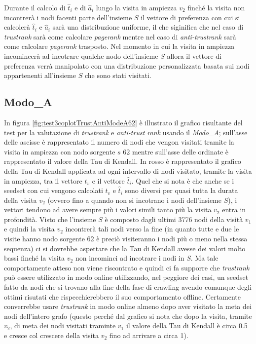 Durante il calcolo di \(\hat{t}_i\) e di \(\hat{a}_i\) lungo la visita in ampiezza \(v_2\) finché la visita non incontrerà i nodi facenti parte dell'insieme \(S\) il vettore di preferenza con cui si calcolerà \(\hat{t}_i\) e \(\hat{a}_i\) sarà una distribuzione uniforme, il che siginifica che nel caso di \textit{trustrank} sarà come calcolare \textit{pagerank} mentre nel caso di \textit{anti-trustrank} sarà come calcolare \textit{pagerank} trasposto. Nel momento in cui la visita in ampiezza incomincerà ad incotrare qualche nodo dell'insieme \(S\) allora il vettore di preferenza verrà manipolato con una distribuzione personalizzata basata sui nodi appartenenti all'insieme \(S\) che sono stati visitati. 

\subsection{Modo\_A}
In figura \ref{fig:test3coplotTrustAntiModeA62} è illustrato il grafico risultante del test per la valutazione di  \textit{trustrank} e \textit{anti-trust rank} usando il \textit{Modo\_A}; sull'asse delle ascisse è rappresentato il numero di nodi che vengon visitati tramite la visita in ampiezza con nodo sorgente \(s\) 62 mentre sull'asse delle ordinate è rappresentato il valore della Tau di Kendall. In rosso è rappresentato il grafico della Tau di Kendall applicata ad ogni intervallo di nodi visitato, tramite la visita in ampiezza, tra il vettore \(t_v\) e il vettore \(\hat{t}_i\). Quel che si nota è che anche se i seedset con cui vengono calcolati \(t_v\) e \(\hat{t}_i\) sono diversi per quasi tutta la durata della visita \(v_2\) (ovvero fino a quando non si incotrano i nodi dell'insieme \(S\)), i vettori tendono ad avere sempre più i valori simili tanto più la visita \(v_2\) entra in profondità. Visto che l'insieme \(S\) è composto dagli ultimi 3776 nodi della visità \(v_1\) e quindi la visita \(v_2\) incontrerà tali nodi verso la fine (in quanto tutte e due le visite hanno nodo sorgente 62 è preciò visiteranno i nodi più o meno nella stessa sequenza) ci si dovrebbe aspettare che la Tau di Kendall avesse dei valori molto bassi finché la visita \(v_2\) non incominci ad incotrare i nodi in \(S\). Ma tale comportamente atteso non viene riscontrato e quindi ci fa supporre che \textit{trustrank} può essere utilizzato in modo online utilizzando, nel peggiore dei casi, un seedset fatto da nodi  che si trovano alla fine della fase di crawling avendo comunque degli ottimi risutati che rispecchierebbero il suo comportamento offline. Certamente converrebbe usare \textit{trustrank} in modo online almeno dopo aver visitato la meta dei nodi dell'intero grafo (questo perché dal grafico si nota che dopo la visita, tramite \(v_2\), di meta dei nodi visitati traminte \(v_1\) il valore della Tau di Kendall è circa 0.5 e cresce col crescere della visita \(v_2\) fino ad arrivare a circa 1).\\
